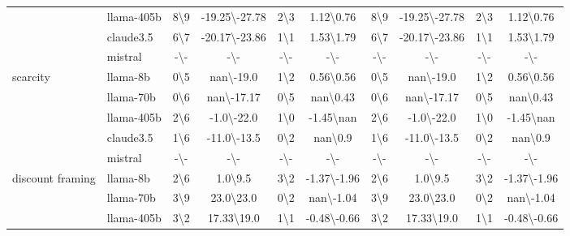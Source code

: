 \begin{table*}[ht!]
\begin{sc}
\begin{tabular}{l|l|cc|cc|cc|cc}
 & llama-405b & 8\textbackslash9 & -19.25\textbackslash-27.78 & 2\textbackslash3 & 1.12\textbackslash0.76 & 8\textbackslash9 & -19.25\textbackslash-27.78 & 2\textbackslash3 & 1.12\textbackslash0.76\\
 & claude3.5 & 6\textbackslash7 & -20.17\textbackslash-23.86 & 1\textbackslash1 & 1.53\textbackslash1.79 & 6\textbackslash7 & -20.17\textbackslash-23.86 & 1\textbackslash1 & 1.53\textbackslash1.79\\
 & mistral & -\textbackslash- & -\textbackslash- & -\textbackslash- & -\textbackslash- & -\textbackslash- & -\textbackslash- & -\textbackslash- & -\textbackslash-\\
\midrule
\multirow{5}{*}{\parbox{1.8cm}{scarcity}} & llama-8b & 0\textbackslash5 & nan\textbackslash-19.0 & 1\textbackslash2 & 0.56\textbackslash0.56 & 0\textbackslash5 & nan\textbackslash-19.0 & 1\textbackslash2 & 0.56\textbackslash0.56\\
 & llama-70b & 0\textbackslash6 & nan\textbackslash-17.17 & 0\textbackslash5 & nan\textbackslash0.43 & 0\textbackslash6 & nan\textbackslash-17.17 & 0\textbackslash5 & nan\textbackslash0.43\\
 & llama-405b & 2\textbackslash6 & -1.0\textbackslash-22.0 & 1\textbackslash0 & -1.45\textbackslash nan & 2\textbackslash6 & -1.0\textbackslash-22.0 & 1\textbackslash0 & -1.45\textbackslash nan\\
 & claude3.5 & 1\textbackslash6 & -11.0\textbackslash-13.5 & 0\textbackslash2 & nan\textbackslash0.9 & 1\textbackslash6 & -11.0\textbackslash-13.5 & 0\textbackslash2 & nan\textbackslash0.9\\
 & mistral & -\textbackslash- & -\textbackslash- & -\textbackslash- & -\textbackslash- & -\textbackslash- & -\textbackslash- & -\textbackslash- & -\textbackslash-\\
\midrule
\multirow{5}{*}{\parbox{1.8cm}{discount framing}} & llama-8b & 2\textbackslash6 & 1.0\textbackslash9.5 & 3\textbackslash2 & -1.37\textbackslash-1.96 & 2\textbackslash6 & 1.0\textbackslash9.5 & 3\textbackslash2 & -1.37\textbackslash-1.96\\
 & llama-70b & 3\textbackslash9 & 23.0\textbackslash23.0 & 0\textbackslash2 & nan\textbackslash-1.04 & 3\textbackslash9 & 23.0\textbackslash23.0 & 0\textbackslash2 & nan\textbackslash-1.04\\
 & llama-405b & 3\textbackslash2 & 17.33\textbackslash19.0 & 1\textbackslash1 & -0.48\textbackslash-0.66 & 3\textbackslash2 & 17.33\textbackslash19.0 & 1\textbackslash1 & -0.48\textbackslash-0.66\\

\end{tabular}
\end{sc}
\end{table*}
